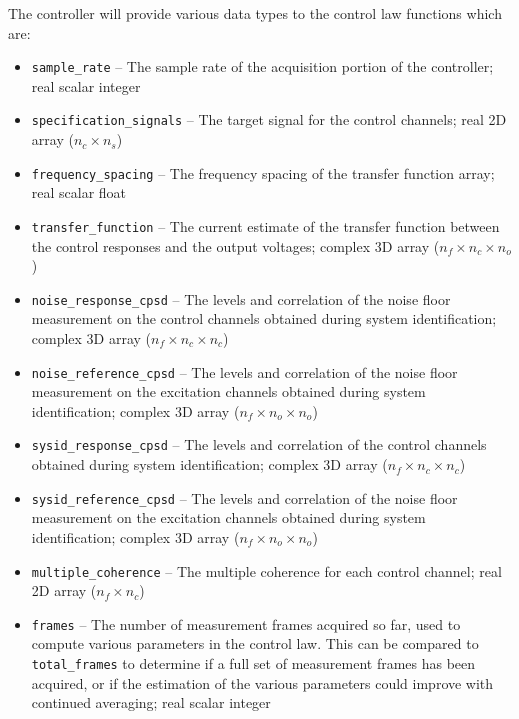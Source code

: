 \documentclass[pdf,12pt,report]{SANDreport}
\newcommand{\inlineCode}{\lstinline[basicstyle=\bfseries\ttfamily]}
\begin{document}
    The controller will provide various data types to the control law functions which are:
    \begin{itemize}
        \item \inlineCode{sample_rate} -- The sample rate of the acquisition portion of the controller; real scalar integer
        
        \item \inlineCode{specification_signals} -- The target signal for the control channels; real 2D array ($n_c \times n_s$)
        
        \item \inlineCode{frequency_spacing} -- The frequency spacing of the transfer function array; real scalar float
        
        \item \inlineCode{transfer_function} -- The current estimate of the transfer function between the control responses and the output voltages; complex 3D array ($n_f \times n_c \times n_o$)
        
        \item \inlineCode{noise_response_cpsd} -- The levels and correlation of the noise floor measurement on the control channels obtained during system identification; complex 3D array ($n_{f} \times n_{c}\times n_{c}$)
        
        \item \inlineCode{noise_reference_cpsd} -- The levels and correlation of the noise floor measurement on the excitation channels obtained during system identification; complex 3D array ($n_{f} \times n_{o}\times n_{o}$)
        
        \item \inlineCode{sysid_response_cpsd} -- The levels and correlation of the control channels obtained during system identification; complex 3D array ($n_{f} \times n_{c}\times n_{c}$)
        
        \item \inlineCode{sysid_reference_cpsd} -- The levels and correlation of the noise floor measurement on the excitation channels obtained during system identification; complex 3D array ($n_{f} \times n_{o}\times n_{o}$)
        
        \item \inlineCode{multiple_coherence} -- The multiple coherence for each control channel; real 2D array ($n_f \times n_c$)
        
        \item \inlineCode{frames} -- The number of measurement frames acquired so far, used to compute various parameters in the control law.  This can be compared to \inlineCode{total_frames} to determine if a full set of measurement frames has been acquired, or if the estimation of the various parameters could improve with continued averaging; real scalar integer
        

\end{itemize}
\end{document}
